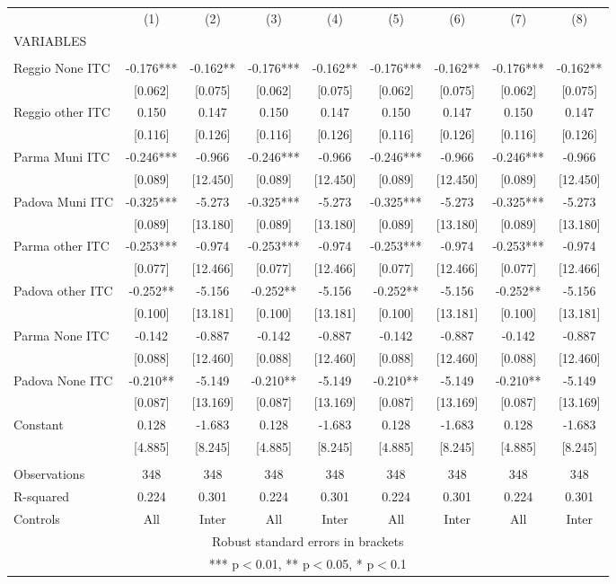 \begin{tabular}{lcccccccc} \hline
 & (1) & (2) & (3) & (4) & (5) & (6) & (7) & (8) \\
VARIABLES &  &  &  &  &  &  &  &  \\ \hline
 &  &  &  &  &  &  &  &  \\
Reggio None ITC & -0.176*** & -0.162** & -0.176*** & -0.162** & -0.176*** & -0.162** & -0.176*** & -0.162** \\
 & [0.062] & [0.075] & [0.062] & [0.075] & [0.062] & [0.075] & [0.062] & [0.075] \\
Reggio other ITC & 0.150 & 0.147 & 0.150 & 0.147 & 0.150 & 0.147 & 0.150 & 0.147 \\
 & [0.116] & [0.126] & [0.116] & [0.126] & [0.116] & [0.126] & [0.116] & [0.126] \\
Parma Muni ITC & -0.246*** & -0.966 & -0.246*** & -0.966 & -0.246*** & -0.966 & -0.246*** & -0.966 \\
 & [0.089] & [12.450] & [0.089] & [12.450] & [0.089] & [12.450] & [0.089] & [12.450] \\
Padova Muni ITC & -0.325*** & -5.273 & -0.325*** & -5.273 & -0.325*** & -5.273 & -0.325*** & -5.273 \\
 & [0.089] & [13.180] & [0.089] & [13.180] & [0.089] & [13.180] & [0.089] & [13.180] \\
Parma other ITC & -0.253*** & -0.974 & -0.253*** & -0.974 & -0.253*** & -0.974 & -0.253*** & -0.974 \\
 & [0.077] & [12.466] & [0.077] & [12.466] & [0.077] & [12.466] & [0.077] & [12.466] \\
Padova other ITC & -0.252** & -5.156 & -0.252** & -5.156 & -0.252** & -5.156 & -0.252** & -5.156 \\
 & [0.100] & [13.181] & [0.100] & [13.181] & [0.100] & [13.181] & [0.100] & [13.181] \\
Parma None ITC & -0.142 & -0.887 & -0.142 & -0.887 & -0.142 & -0.887 & -0.142 & -0.887 \\
 & [0.088] & [12.460] & [0.088] & [12.460] & [0.088] & [12.460] & [0.088] & [12.460] \\
Padova None ITC & -0.210** & -5.149 & -0.210** & -5.149 & -0.210** & -5.149 & -0.210** & -5.149 \\
 & [0.087] & [13.169] & [0.087] & [13.169] & [0.087] & [13.169] & [0.087] & [13.169] \\
Constant & 0.128 & -1.683 & 0.128 & -1.683 & 0.128 & -1.683 & 0.128 & -1.683 \\
 & [4.885] & [8.245] & [4.885] & [8.245] & [4.885] & [8.245] & [4.885] & [8.245] \\
 &  &  &  &  &  &  &  &  \\
Observations & 348 & 348 & 348 & 348 & 348 & 348 & 348 & 348 \\
R-squared & 0.224 & 0.301 & 0.224 & 0.301 & 0.224 & 0.301 & 0.224 & 0.301 \\
 Controls & All & Inter & All & Inter & All & Inter & All & Inter \\ \hline
\multicolumn{9}{c}{ Robust standard errors in brackets} \\
\multicolumn{9}{c}{ *** p$<$0.01, ** p$<$0.05, * p$<$0.1} \\
\end{tabular}
